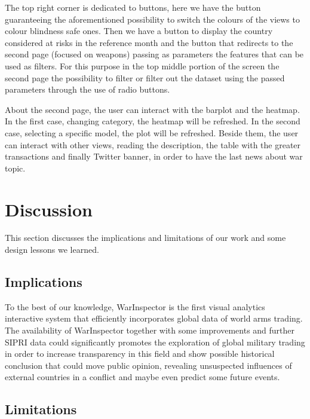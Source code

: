 \documentclass{article}
\begin{document}
\begin{multicols}{2}
The top right corner is dedicated to buttons, here we have the button guaranteeing the aforementioned possibility to switch the colours of the views to colour blindness safe ones. Then we have a button to display the country considered at risks in the reference month and the button that redirects to the second page (focused on weapons) passing as parameters the features that can be used as filters.
For this purpose in the top middle portion of the screen the second page the possibility to filter or filter out the dataset using the passed parameters through the use of radio buttons.

About the second page, the user can interact with the barplot and the heatmap. In the first case, changing category, the heatmap will be refreshed. In the second case, selecting a specific model, the plot will be refreshed. Beside them, the user can interact with other views, reading the description, the table with the greater transactions and finally Twitter banner, in order to have the last news about war topic.


\section{Discussion}

This section discusses the implications and limitations of our work and some design lessons we learned.
\subsection{Implications}
To the best of our knowledge, WarInspector is the first visual analytics interactive system that efficiently incorporates  global data of world arms trading. The availability of WarInspector together with some improvements and further SIPRI data could significantly promotes the exploration of global military trading in order to increase transparency in this field and show possible historical conclusion that could move public opinion, revealing unsuspected influences of external countries in a conflict and maybe even predict some future events. 

\subsection{Limitations}


\end{multicols}
\end{document}
